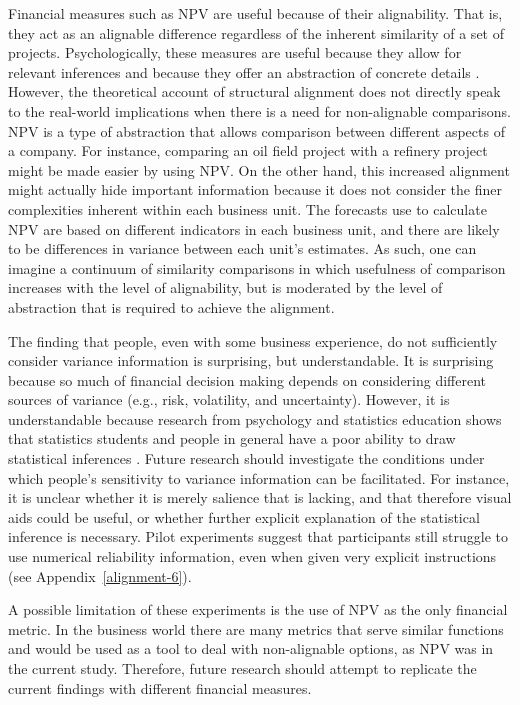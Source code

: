\documentclass[a4paper, nobind, dvipsnames]{templates/ociamthesis}
\theoremstyle{definition}
\theoremstyle{definition}
\theoremstyle{definition}
\theoremstyle{definition}
\theoremstyle{remark}
\begin{document}
Financial measures such as NPV are useful because of their alignability. That
is, they act as an alignable difference regardless of the inherent similarity of
a set of projects. Psychologically, these measures are useful because they allow
for relevant inferences \autocite{lassaline1996} and because they offer an abstraction
of concrete details \autocite{doumas2013}. However, the theoretical account of
structural alignment does not directly speak to the real-world implications when
there is a need for non-alignable comparisons. NPV is a type of abstraction that
allows comparison between different aspects of a company. For instance,
comparing an oil field project with a refinery project might be made easier by
using NPV. On the other hand, this increased alignment might actually hide
important information because it does not consider the finer complexities
inherent within each business unit. The forecasts use to calculate NPV are based
on different indicators in each business unit, and there are likely to be
differences in variance between each unit's estimates. As such, one can imagine
a continuum of similarity comparisons in which usefulness of comparison
increases with the level of alignability, but is moderated by the level of
abstraction that is required to achieve the alignment.

The finding that people, even with some business experience, do not sufficiently
consider variance information is surprising, but understandable. It is
surprising because so much of financial decision making depends on considering
different sources of variance (e.g., risk, volatility, and uncertainty).
However, it is understandable because research from psychology and statistics
education shows that statistics students and people in general have a poor
ability to draw statistical inferences \autocites[e.g.,][]{galesic2010,konold1993}. Future
research should investigate the conditions under which people's sensitivity to
variance information can be facilitated. For instance, it is unclear whether it
is merely salience that is lacking, and that therefore visual aids could be
useful, or whether further explicit explanation of the statistical inference is
necessary. Pilot experiments suggest that participants still struggle to use
numerical reliability information, even when given very explicit instructions
(see Appendix~\ref{alignment-6}).

A possible limitation of these experiments is the use of NPV as the only
financial metric. In the business world there are many metrics that serve
similar functions and would be used as a tool to deal with non-alignable
options, as NPV was in the current study. Therefore, future research should
attempt to replicate the current findings with different financial measures.
\end{document}
